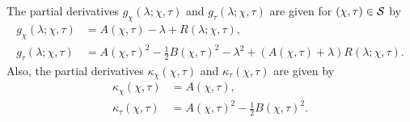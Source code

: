 \begin{lemma}
The partial derivatives $g_{\chi}(\lambda;\chi,\tau)$ and $g_{\tau}(\lambda;\chi,\tau)$ are given for $(\chi,\tau)\in \mathcal{S}$ by
\begin{align}
g_{\chi}(\lambda;\chi,\tau) &=  A(\chi,\tau) - \lambda + R(\lambda;\chi,\tau),\label{eq:g-chi}\\
g_{\tau}(\lambda;\chi,\tau) &= A(\chi,\tau)^2 - \frac{1}{2}B(\chi,\tau)^2 - \lambda^2 + (A(\chi,\tau) + \lambda) R(\lambda;\chi,\tau)\label{eq:g-tau}.
\end{align}
Also, the partial derivatives $\kappa_\chi(\chi,\tau)$ and $\kappa_\tau(\chi,\tau)$ are given by
\begin{align}
\kappa_\chi(\chi,\tau) &= A(\chi,\tau)\label{eq:kappa-chi},\\
\kappa_\tau(\chi,\tau) &= A(\chi,\tau)^2 - \frac{1}{2} B(\chi,\tau)^2\label{eq:kappa-tau}.
\end{align}
\label{lemma:g-derivatives}
\end{lemma}
